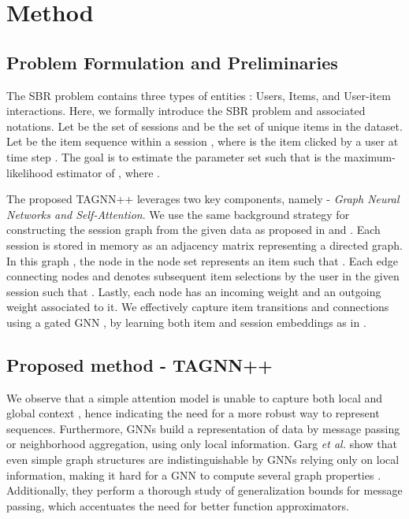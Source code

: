 \documentclass[conference]{IEEEtran}
\begin{document}
\section{Method}

\subsection{Problem Formulation and Preliminaries}
The SBR problem contains three types of entities : Users, Items, and User-item interactions. Here, we formally introduce the SBR problem and associated notations. Let  be the set of  sessions and  be the set of  unique items in the dataset. Let  be the item sequence within a session , where  is the item clicked by a user at time step . The goal is to estimate the parameter set  such that  is the maximum-likelihood estimator of , where .

The proposed TAGNN++ leverages two key components, namely - \emph{Graph Neural Networks and Self-Attention}. We use the same background strategy for constructing the session graph from the given data as proposed in \cite{yu2020tagnn} and \cite{Wu:2019ke}. Each session is stored in memory as an adjacency matrix representing a directed graph. In this graph , the  node in the node set  represents an item such that . Each edge connecting nodes  and  denotes subsequent item selections by the user in the given session  such that  \cite{yu2020tagnn}. Lastly, each node has an incoming weight and an outgoing weight associated to it. We effectively capture item transitions and connections using a gated GNN \cite{li2015gated}, by learning both item and session embeddings as in \cite{yu2020tagnn}.



\subsection{Proposed method - TAGNN++}
We observe that a simple attention model is unable to capture both local and global context \cite{NIPS2017_3f5ee243}, hence indicating the need for a more robust way to represent sequences. Furthermore, GNNs build a representation of data by message passing or neighborhood aggregation, using only local information. Garg \textit{et al.} show that even simple graph structures are indistinguishable by GNNs relying only on local information, making it hard for a GNN to compute several graph properties \cite{garg2020generalization}. Additionally, they perform a thorough study of generalization bounds for message passing, which accentuates the need for better function approximators.
\end{document}

